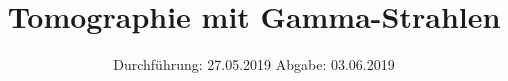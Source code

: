 

\subject{V14}
\title{Tomographie mit Gamma-Strahlen}
\date{%
  Durchführung: 27.05.2019
  \hspace{3em}
  Abgabe: 03.06.2019
}



\maketitle
\thispagestyle{empty}
\tableofcontents
\newpage






\printbibliography{}


